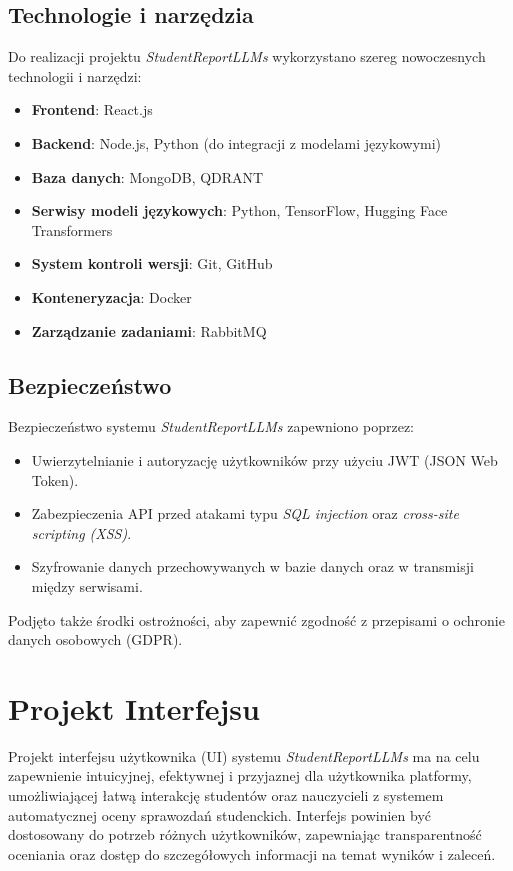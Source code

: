 \documentclass[a4paper, 12pt]{article}
\begin{document}
\subsection{Technologie i narzędzia}

Do realizacji projektu \textit{StudentReportLLMs} wykorzystano szereg nowoczesnych technologii i narzędzi:

\begin{itemize}
    \item \textbf{Frontend}: React.js
    \item \textbf{Backend}: Node.js, Python (do integracji z modelami językowymi)
    \item \textbf{Baza danych}: MongoDB, QDRANT
    \item \textbf{Serwisy modeli językowych}: Python, TensorFlow, Hugging Face Transformers
    \item \textbf{System kontroli wersji}: Git, GitHub
    \item \textbf{Konteneryzacja}: Docker
    \item \textbf{Zarządzanie zadaniami}: RabbitMQ
\end{itemize}

\subsection{Bezpieczeństwo}

Bezpieczeństwo systemu \textit{StudentReportLLMs} zapewniono poprzez:

\begin{itemize}
    \item Uwierzytelnianie i autoryzację użytkowników przy użyciu JWT (JSON Web Token).
    \item Zabezpieczenia API przed atakami typu \textit{SQL injection} oraz \textit{cross-site scripting (XSS)}.
    \item Szyfrowanie danych przechowywanych w bazie danych oraz w transmisji między serwisami.
\end{itemize}

Podjęto także środki ostrożności, aby zapewnić zgodność z przepisami o ochronie danych osobowych (GDPR).

\section{Projekt Interfejsu}
Projekt interfejsu użytkownika (UI) systemu \textit{StudentReportLLMs} ma na celu zapewnienie intuicyjnej, efektywnej i przyjaznej dla użytkownika platformy, umożliwiającej łatwą interakcję studentów oraz nauczycieli z systemem automatycznej oceny sprawozdań studenckich. Interfejs powinien być dostosowany do potrzeb różnych użytkowników, zapewniając transparentność oceniania oraz dostęp do szczegółowych informacji na temat wyników i zaleceń.
\end{document}
